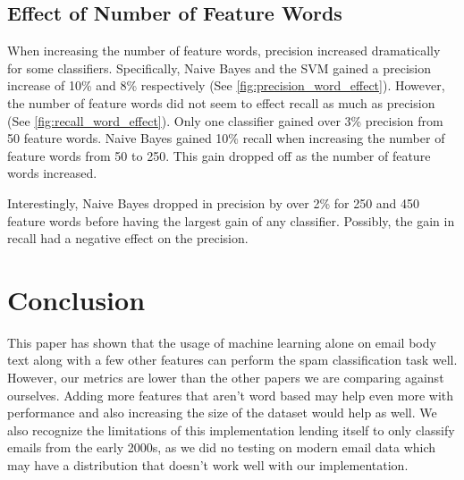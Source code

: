 \documentclass[12pt]{article}
\begin{document}
    \begin{multicols}{2}
            \subsection{Effect of Number of Feature Words} 
                When increasing the number of feature words, precision increased dramatically for some classifiers. 
                Specifically, Naive Bayes and the SVM gained a precision increase of 10\% and 8\% respectively (See \autoref{fig:precision_word_effect}).
                However, the number of feature words did not seem to effect recall as much as precision (See \autoref{fig:recall_word_effect}).
                Only one classifier gained over 3\% precision from 50 feature words. Naive Bayes gained 10\% recall when increasing 
                the number of feature words from 50 to 250. This gain dropped off as the number of feature words increased.

                Interestingly, Naive Bayes dropped in precision by over 2\% 
                for 250 and 450 feature words before having the largest gain of any classifier. 
                Possibly, the gain in recall had a negative effect on the precision.
                
        \section{Conclusion}

            This paper has shown that the usage of machine learning alone on email body text 
            along with a few other features can perform the spam classification task well. 
            However, our metrics are lower
            than the other papers we are comparing against ourselves. Adding more features
            that aren't word based may help even more with performance and also increasing the
            size of the dataset would help as well. We also recognize the limitations of
            this implementation lending itself to only classify emails from the early 2000s, as
            we did no testing on modern email data which may have a distribution that doesn't
            work well with our implementation.
        \nocite{*}
         
        
    \end{multicols}
\end{document}
